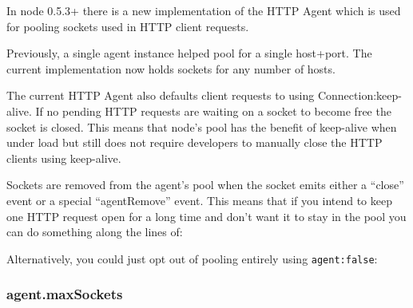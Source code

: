 In node 0.5.3+ there is a new implementation of the HTTP Agent which is
used for pooling sockets used in HTTP client requests.

Previously, a single agent instance helped pool for a single host+port.
The current implementation now holds sockets for any number of hosts.

The current HTTP Agent also defaults client requests to using
Connection:keep-alive. If no pending HTTP requests are waiting on a
socket to become free the socket is closed. This means that node's pool
has the benefit of keep-alive when under load but still does not require
developers to manually close the HTTP clients using keep-alive.

Sockets are removed from the agent's pool when the socket emits either a
``close'' event or a special ``agentRemove'' event. This means that if
you intend to keep one HTTP request open for a long time and don't want
it to stay in the pool you can do something along the lines of:

\begin{Shaded}
\begin{Highlighting}[]
\NormalTok{(}\NormalTok{, } 
  \NormalTok{(}\NormalTok{);}
\NormalTok{\});}
\end{Highlighting}
\end{Shaded}

Alternatively, you could just opt out of pooling entirely using
\texttt{agent:false}:

\begin{Shaded}
\begin{Highlighting}[]
\NormalTok{(\{}\NormalTok{:}\NormalTok{, }\NormalTok{:}\NormalTok{, }\NormalTok{:}\NormalTok{, }\NormalTok{:}\NormalTok{\}, } 
\NormalTok{\})}
\end{Highlighting}
\end{Shaded}

\subsubsection{agent.maxSockets}

